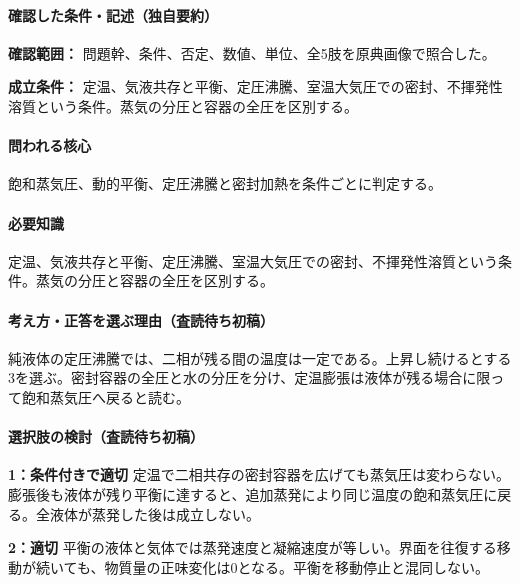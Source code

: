 \paragraph{確認した条件・記述（独自要約）}\mbox{}\par

\noindent\textbf{確認範囲：} 問題幹、条件、否定、数値、単位、全5肢を原典画像で照合した。\par

\noindent\textbf{成立条件：} 定温、気液共存と平衡、定圧沸騰、室温大気圧での密封、不揮発性溶質という条件。蒸気の分圧と容器の全圧を区別する。\par

\paragraph{問われる核心} 飽和蒸気圧、動的平衡、定圧沸騰と密封加熱を条件ごとに判定する。

\paragraph{必要知識} 定温、気液共存と平衡、定圧沸騰、室温大気圧での密封、不揮発性溶質という条件。蒸気の分圧と容器の全圧を区別する。

\paragraph{考え方・正答を選ぶ理由（査読待ち初稿）} 純液体の定圧沸騰では、二相が残る間の温度は一定である。上昇し続けるとする3を選ぶ。密封容器の全圧と水の分圧を分け、定温膨張は液体が残る場合に限って飽和蒸気圧へ戻ると読む。

\paragraph{選択肢の検討（査読待ち初稿）}\mbox{}\par

\noindent\textbf{1：条件付きで適切} 定温で二相共存の密封容器を広げても蒸気圧は変わらない。膨張後も液体が残り平衡に達すると、追加蒸発により同じ温度の飽和蒸気圧に戻る。全液体が蒸発した後は成立しない。\par

\noindent\textbf{2：適切} 平衡の液体と気体では蒸発速度と凝縮速度が等しい。界面を往復する移動が続いても、物質量の正味変化は0となる。平衡を移動停止と混同しない。\par

